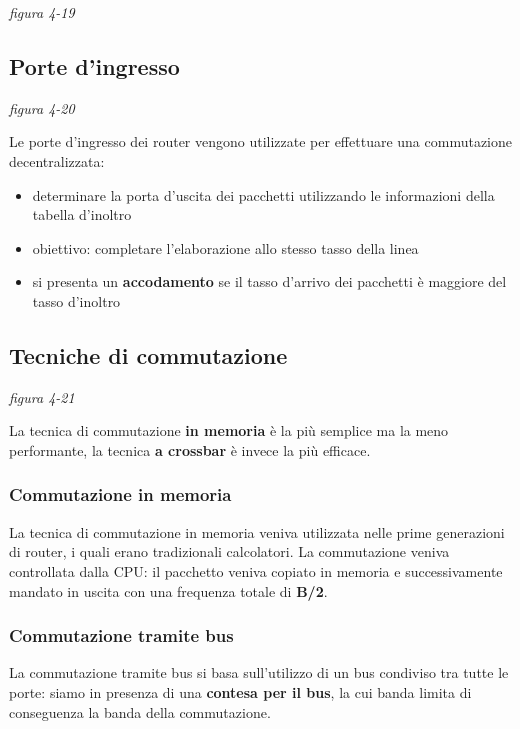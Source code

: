 \documentclass[
]{article}
\begin{document}
\emph{figura 4-19}

\hypertarget{header-n57}{%
\subsection{Porte d'ingresso}\label{header-n57}}

\emph{figura 4-20}

Le porte d'ingresso dei router vengono utilizzate per effettuare una
commutazione decentralizzata:

\begin{itemize}
\item
  determinare la porta d'uscita dei pacchetti utilizzando le
  informazioni della tabella d'inoltro
\item
  obiettivo: completare l'elaborazione allo stesso tasso della linea
\item
  si presenta un \textbf{accodamento} se il tasso d'arrivo dei pacchetti
  è maggiore del tasso d'inoltro
\end{itemize}

\hypertarget{header-n67}{%
\subsection{Tecniche di commutazione}\label{header-n67}}

\emph{figura 4-21}

La tecnica di commutazione \textbf{in memoria} è la più semplice ma la
meno performante, la tecnica \textbf{a crossbar} è invece la più
efficace.

\hypertarget{header-n70}{%
\subsubsection{Commutazione in memoria}\label{header-n70}}

La tecnica di commutazione in memoria veniva utilizzata nelle prime
generazioni di router, i quali erano tradizionali calcolatori. La
commutazione veniva controllata dalla CPU: il pacchetto veniva copiato
in memoria e successivamente mandato in uscita con una frequenza totale
di \textbf{B/2}.

\hypertarget{header-n72}{%
\subsubsection{Commutazione tramite bus}\label{header-n72}}

La commutazione tramite bus si basa sull'utilizzo di un bus condiviso
tra tutte le porte: siamo in presenza di una \textbf{contesa per il
bus}, la cui banda limita di conseguenza la banda della commutazione.
\end{document}
